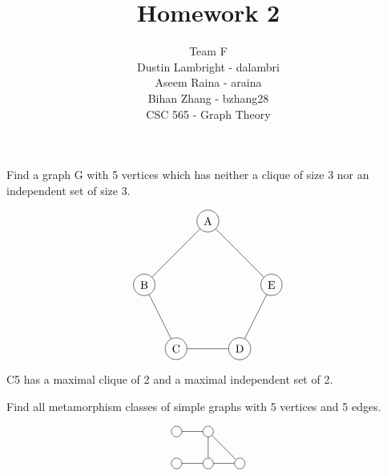 \documentclass[12pt]{article}
\newenvironment{question}[2][Question]{\begin{trivlist}
\item[\hskip \labelsep {\bfseries #1}\hskip \labelsep {\bfseries #2.}]}{\end{trivlist}}
\begin{document}


\title{Homework 2}%
\author{Team F \\ Dustin Lambright - dalambri \\ Aseem Raina - araina \\ Bihan Zhang - bzhang28\\ %
CSC 565 - Graph Theory} %

\maketitle

\begin{question}{1}
Find a graph G with 5 vertices which has neither a clique of size 3 nor an independent set of size 3.
\end{question}

\begin{align*}
\begin{tikzpicture}
    \node[shape=circle,draw=black] (C) at (1,0) {C};
    \node[shape=circle,draw=black] (B) at (0,2) {B};
    \node[shape=circle,draw=black] (A) at (2,4) {A};
    \node[shape=circle,draw=black] (D) at (3,0) {D};
    \node[shape=circle,draw=black] (E) at (4,2) {E};
    \path [] (A) edge node[left] {} (B);
    \path [] (B) edge node[left] {} (C);
    \path [] (C) edge node[left] {} (D);
    \path [] (D) edge node[left] {} (E);
    \path [] (E) edge node[left] {} (A);
\end{tikzpicture}
\end{align*}
C5 has a maximal clique of 2 and a maximal independent set of 2.


\begin{question}{2}
	Find all metamorphism classes of simple graphs with 5 vertices and 5 edges.
\end{question}


\begin{align*}
\begin{tikzpicture}
\node[shape=circle,draw=black] (A) at (0,0) {};
\node[shape=circle,draw=black] (B) at (1,0) {};
\node[shape=circle,draw=black] (C) at (0,-1) {};
\node[shape=circle,draw=black] (D) at (1,-1) {};
\node[shape=circle,draw=black] (E) at (2,-1) {};
\path [] (A) edge node[left] {} (B);
\path [] (C) edge node[left] {} (D);
\path [] (B) edge node[left] {} (D);
\path [] (B) edge node[left] {} (E);
\path [] (D) edge node[left] {} (E);
\end{tikzpicture}
\end{align*}
\end{document}
